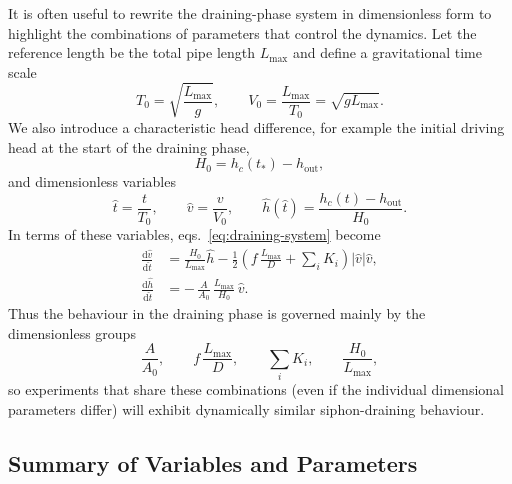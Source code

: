 \documentclass[11pt]{article}
\begin{document}
It is often useful to rewrite the draining-phase system in dimensionless form
to highlight the combinations of parameters that control the dynamics.  Let
the reference length be the total pipe length $L_{\max}$ and define a
gravitational time scale
\[
T_0 = \sqrt{\frac{L_{\max}}{g}}, \qquad
V_0 = \frac{L_{\max}}{T_0} = \sqrt{gL_{\max}}.
\]
We also introduce a characteristic head difference, for example the initial
driving head at the start of the draining phase,
\[
H_0 = h_c(t_\ast) - h_{\text{out}},
\]
and dimensionless variables
\[
\hat t = \frac{t}{T_0}, \qquad
\hat v = \frac{v}{V_0}, \qquad
\hat h(\hat t) = \frac{h_c(t)-h_{\text{out}}}{H_0}.
\]
In terms of these variables, eqs.~\eqref{eq:draining-system} become
\begin{align}
\frac{\mathrm{d}\hat v}{\mathrm{d}\hat t}
&= \frac{H_0}{L_{\max}}\hat h
   - \frac{1}{2}\left(
       f\,\frac{L_{\max}}{D}
       + \sum_i K_i
     \right)\lvert\hat v\rvert\hat v,
\\[0.5em]
\frac{\mathrm{d}\hat h}{\mathrm{d}\hat t}
&= -\,\frac{A}{A_0}\,\frac{L_{\max}}{H_0}\,\hat v.
\end{align}
Thus the behaviour in the draining phase is governed mainly by the dimensionless
groups
\[
\frac{A}{A_0}, \qquad
f\,\frac{L_{\max}}{D}, \qquad
\sum_i K_i, \qquad
\frac{H_0}{L_{\max}},
\]
so experiments that share these combinations (even if the individual dimensional
parameters differ) will exhibit dynamically similar siphon-draining behaviour.

\subsection*{Summary of Variables and Parameters}
\end{document}
